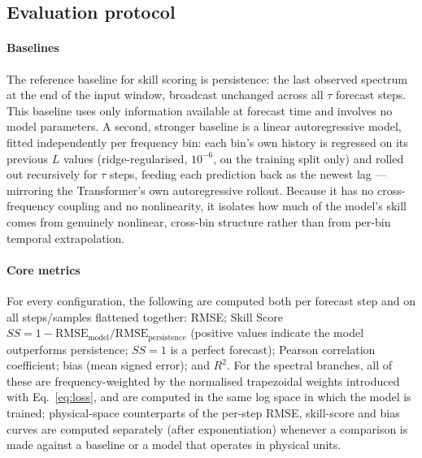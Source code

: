 \subsection{Evaluation protocol}
\label{sec:evaluation}

\paragraph{Baselines}
The reference baseline for skill scoring is persistence: the last observed spectrum at the end of the input window, broadcast unchanged across all $\tau$ forecast steps. This baseline uses only information available at forecast time and involves no model parameters. A second, stronger baseline is a linear autoregressive model, fitted independently per frequency bin: each bin's own history is regressed on its previous $L$ values (ridge-regularised, $10^{-6}$, on the training split only) and rolled out recursively for $\tau$ steps, feeding each prediction back as the newest lag — mirroring the Transformer's own autoregressive rollout. Because it has no cross-frequency coupling and no nonlinearity, it isolates how much of the model's skill comes from genuinely nonlinear, cross-bin structure rather than from per-bin temporal extrapolation.

\paragraph{Core metrics}
For every configuration, the following are computed both per forecast step and on all steps/samples flattened together: RMSE; Skill Score $SS = 1 - \mathrm{RMSE}_{\text{model}}/\mathrm{RMSE}_{\text{persistence}}$ (positive values indicate the model outperforms persistence; $SS=1$ is a perfect forecast); Pearson correlation coefficient; bias (mean signed
error); and $R^2$. For the spectral branches, all of these are frequency-weighted by the normalised trapezoidal weights introduced with Eq.~\eqref{eq:loss}, and are computed in the same log space in which the model is trained; physical-space counterparts of the per-step RMSE, skill-score and bias curves are computed separately (after exponentiation) whenever a comparison is made against a baseline or a model that operates in physical units.

